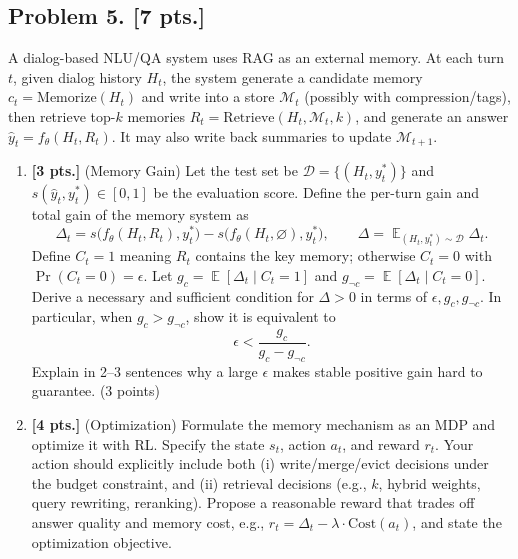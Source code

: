 \documentclass[11pt,a4paper]{article}
\DeclareMathOperator{\E}{\mathbb{E}}
\begin{document}
\subsection{Problem 5. [7 pts.]}
A dialog-based NLU/QA system uses RAG as an external memory. At each turn $t$, given dialog history $H_t$, the system generate a candidate memory $c_t = \mathrm{Memorize}(H_t)$ and write into a store $\mathcal{M}_t$ (possibly with compression/tags), then retrieve top-$k$ memories $R_t = \mathrm{Retrieve}(H_t, \mathcal{M}_t, k)$, and generate an answer $\hat{y}_t = f_{\theta}(H_t, R_t)$. It may also write back summaries to update $\mathcal{M}_{t+1}$.
\begin{enumerate}[label=(\alph*)]
    \item \textbf{[3 pts.]} (Memory Gain) Let the test set be $\mathcal{D} = \{(H_t, y_t^{*})\}$ and $s(\hat{y}_t, y_t^{*}) \in [0, 1]$ be the evaluation score. Define the per-turn gain and total gain of the memory system as
    \[
    \Delta_t = s\bigl(f_{\theta}(H_t, R_t), y_t^{*}\bigr) - s\bigl(f_{\theta}(H_t, \varnothing), y_t^{*}\bigr), \qquad \Delta = \E_{(H_t, y_t^{*}) \sim \mathcal{D}} \Delta_t.
    \]
    Define $C_t = 1$ meaning $R_t$ contains the key memory; otherwise $C_t = 0$ with $\Pr(C_t = 0) = \epsilon$. Let $g_c = \E[\Delta_t \mid C_t = 1]$ and $g_{\neg c} = \E[\Delta_t \mid C_t = 0]$. Derive a necessary and sufficient condition for $\Delta > 0$ in terms of $\epsilon, g_c, g_{\neg c}$. In particular, when $g_c > g_{\neg c}$, show it is equivalent to
    \[
    \epsilon < \frac{g_c}{g_c - g_{\neg c}}.
    \]
    Explain in 2--3 sentences why a large $\epsilon$ makes stable positive gain hard to guarantee. (3 points)
    \item \textbf{[4 pts.]} (Optimization) Formulate the memory mechanism as an MDP and optimize it with RL. Specify the state $s_t$, action $a_t$, and reward $r_t$. Your action should explicitly include both (i) write/merge/evict decisions under the budget constraint, and (ii) retrieval decisions (e.g., $k$, hybrid weights, query rewriting, reranking). Propose a reasonable reward that trades off answer quality and memory cost, e.g., $r_t = \Delta_t - \lambda \cdot \mathrm{Cost}(a_t)$, and state the optimization objective.
\end{enumerate}
\end{document}
